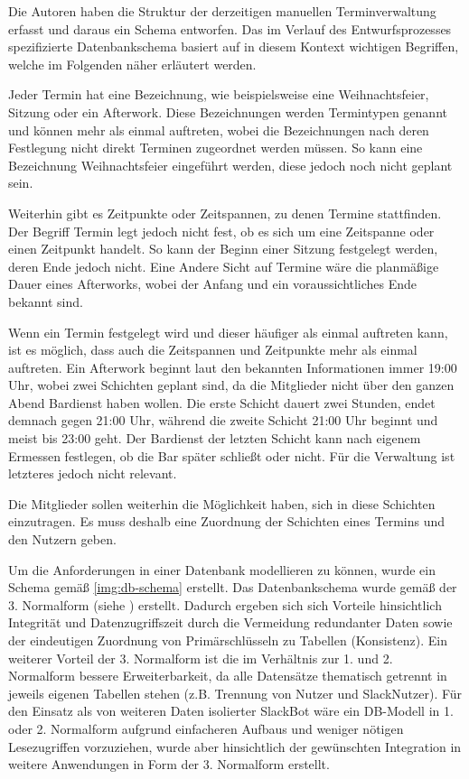 Die Autoren haben die Struktur der derzeitigen manuellen Terminverwaltung erfasst und daraus ein Schema entworfen. 
Das im Verlauf des Entwurfsprozesses spezifizierte Datenbankschema basiert auf in diesem Kontext wichtigen Begriffen, welche im Folgenden näher erläutert werden.

Jeder Termin hat eine Bezeichnung, wie beispielsweise eine Weihnachtsfeier, Sitzung oder ein Afterwork. Diese Bezeichnungen werden Termintypen genannt und können mehr als einmal auftreten, wobei die Bezeichnungen nach deren Festlegung nicht direkt Terminen zugeordnet werden müssen. So kann eine Bezeichnung Weihnachtsfeier eingeführt werden, diese jedoch noch nicht geplant sein.

Weiterhin gibt es Zeitpunkte oder Zeitspannen, zu denen Termine stattfinden. Der Begriff Termin legt jedoch nicht fest, ob es sich um eine Zeitspanne oder einen Zeitpunkt handelt. So kann der Beginn einer Sitzung festgelegt werden, deren Ende jedoch nicht. Eine Andere Sicht auf Termine wäre die planmäßige Dauer eines Afterworks, wobei der Anfang und ein voraussichtliches Ende bekannt sind.

Wenn ein Termin festgelegt wird und dieser häufiger als einmal auftreten kann, ist es möglich, dass auch die Zeitspannen und Zeitpunkte mehr als einmal auftreten. Ein Afterwork beginnt laut den bekannten Informationen immer 19:00 Uhr, wobei zwei Schichten geplant sind, da die Mitglieder nicht über den ganzen Abend Bardienst haben wollen. Die erste Schicht dauert zwei Stunden, endet demnach gegen 21:00 Uhr, während die zweite Schicht 21:00 Uhr beginnt und meist bis 23:00 geht. Der Bardienst der letzten Schicht kann nach eigenem Ermessen festlegen, ob die Bar später schließt oder nicht. Für die Verwaltung ist letzteres jedoch nicht relevant.

Die Mitglieder sollen weiterhin die Möglichkeit haben, sich in diese Schichten einzutragen. Es muss deshalb eine Zuordnung der Schichten eines Termins und den Nutzern geben. 


Um die Anforderungen in einer Datenbank modellieren zu können, wurde ein Schema gemäß \autoref{img:db-schema} erstellt. Das Datenbankschema wurde gemäß der 3. Normalform (siehe \cite{CoddRelationalModelData1970}) erstellt. Dadurch ergeben sich sich Vorteile hinsichtlich Integrität und Datenzugriffszeit durch die Vermeidung redundanter Daten sowie der eindeutigen Zuordnung von Primärschlüsseln zu Tabellen (Konsistenz). Ein weiterer Vorteil der 3. Normalform ist die im Verhältnis zur 1. und 2. Normalform bessere Erweiterbarkeit, da alle Datensätze thematisch getrennt in jeweils eigenen Tabellen stehen (z.B. Trennung von Nutzer und SlackNutzer). 
Für den Einsatz als von weiteren Daten isolierter SlackBot wäre ein DB-Modell in 1. oder 2. Normalform aufgrund einfacheren Aufbaus und weniger nötigen Lesezugriffen vorzuziehen, wurde aber hinsichtlich der gewünschten Integration in weitere Anwendungen in Form der 3. Normalform erstellt.

